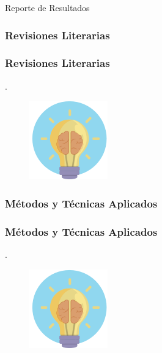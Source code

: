 \documentclass{beamer}
\begin{document}
\begin{frame}
\Huge{\centerline{Reporte de Resultados}}
\end{frame}

\subsubsection{Revisiones Literarias} %
\begin{frame}
    \frametitle{Revisiones Literarias}
    .
	\begin{figure}
		\begin{center}
			\includegraphics[scale=0.45]{images/2icons/need.png}
			\label{student}
		\end{center}
	\end{figure}
\end{frame}
\subsubsection{Métodos y Técnicas Aplicados} %
\begin{frame}
    \frametitle{Métodos y Técnicas Aplicados}
    .
	\begin{figure}
		\begin{center}
			\includegraphics[scale=0.45]{images/2icons/need.png}
			\label{student}
		\end{center}
	\end{figure}
\end{frame}
\end{document}
